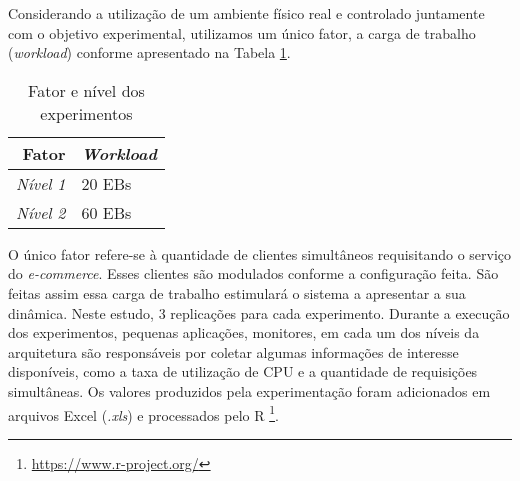 Considerando a utilização de um ambiente físico real e controlado juntamente com o objetivo experimental, utilizamos um único fator, a carga de trabalho (\textit{workload}) conforme apresentado na Tabela \ref{tab:fatores_niveis}.
\begin{table}[htb]
	\centering
	\caption{Fator e nível dos experimentos}
	\label{tab:fatores_niveis}
	\begin{tabularx}{\textwidth}{|r|X|} \hline\hline
		\textbf{Fator}		& \textbf{\textit{Workload}} \\ \hline
		\textit{Nível 1}	&		20 EBs				 \\
		\textit{Nível 2}	&		60 EBs				 \\		
		\hline
	\end{tabularx}
	\fdadospesquisa
\end{table}

O único fator refere-se à quantidade de clientes simultâneos requisitando o serviço do \textit{e-commerce}. Esses clientes são modulados conforme a configuração feita. São feitas assim essa carga de trabalho estimulará o sistema a apresentar a sua dinâmica. Neste estudo, 3 replicações para cada experimento.
Durante a execução dos experimentos, pequenas aplicações, monitores, em cada um dos níveis da arquitetura são responsáveis por coletar algumas informações de interesse disponíveis, como a taxa de utilização de CPU e a quantidade de requisições simultâneas. Os valores produzidos pela experimentação foram adicionados em arquivos Excel (\textit{.xls}) e processados pelo R \footnote{\url{https://www.r-project.org/}}.
